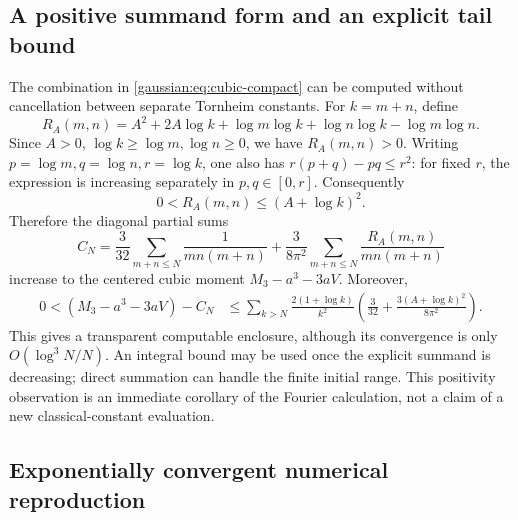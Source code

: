 \subsection{A positive summand form and an explicit tail bound}

The combination in \eqref{gaussian:eq:cubic-compact} can be computed without cancellation
between separate Tornheim constants.  For $k=m+n$, define
\[
 R_A(m,n)=A^2+2A\log k+\log m\log k+\log n\log k-\log m\log n.
\]
Since $A>0$, $\log k\ge\log m,\log n\ge0$, we have $R_A(m,n)>0$.
Writing $p=\log m,q=\log n,r=\log k$, one also has
$r(p+q)-pq\le r^2$: for fixed $r$, the expression is increasing separately
in $p,q\in[0,r]$.  Consequently
\[
 0<R_A(m,n)\le(A+\log k)^2.
\]
Therefore the diagonal partial sums
\[
 C_N=\frac3{32}\sum_{m+n\le N}\frac1{mn(m+n)}
    +\frac{3}{8\pi^2}
       \sum_{m+n\le N}\frac{R_A(m,n)}{mn(m+n)}
\]
increase to the centered cubic moment $M_3-a^3-3aV$.  Moreover,
\begin{align*}
 0<(M_3-a^3-3aV)-C_N
 &\le\sum_{k>N}\frac{2(1+\log k)}{k^2}
       \left(\frac3{32}+\frac{3(A+\log k)^2}{8\pi^2}\right).
\end{align*}
This gives a transparent computable enclosure, although its convergence
is only $O(\log^3N/N)$.  An integral bound may be used once the explicit
summand is decreasing; direct summation can handle the finite initial range.
This positivity observation is an immediate corollary of the Fourier
calculation, not a claim of a new classical-constant evaluation.

\subsection{Exponentially convergent numerical reproduction}

